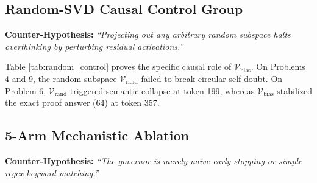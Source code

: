 \documentclass[10pt,twocolumn]{article}
\begin{document}
\subsection{Random-SVD Causal Control Group}
\textbf{Counter-Hypothesis:} \emph{``Projecting out any arbitrary random subspace halts overthinking by perturbing residual activations.''}

\begin{table}[htbp]
\centering
\small
\caption{Causal Specificity: Prompt Subspace $\mathcal{V}_{\text{bias}}$ vs. Random Subspace $\mathcal{V}_{\text{rand}}$.}
\label{tab:random_control}
\end{table}

Table \ref{tab:random_control} proves the specific causal role of $\mathcal{V}_{\text{bias}}$. On Problems 4 and 9, the random subspace $\mathcal{V}_{\text{rand}}$ failed to break circular self-doubt. On Problem 6, $\mathcal{V}_{\text{rand}}$ triggered semantic collapse at token 199, whereas $\mathcal{V}_{\text{bias}}$ stabilized the exact proof answer (64) at token 357.

\subsection{5-Arm Mechanistic Ablation}
\textbf{Counter-Hypothesis:} \emph{``The governor is merely naive early stopping or simple regex keyword matching.''}

\begin{table}[htbp]
\centering
\small
\caption{5-Arm Mechanistic Ablation on \texttt{DeepSeek-R1-Distill-Qwen-7B}.}
\label{tab:ablation}
\end{table}
\end{document}

